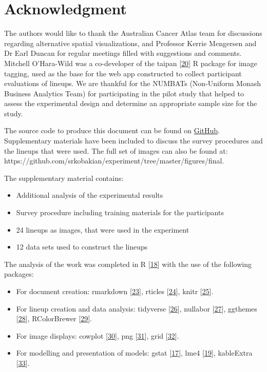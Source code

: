 \documentclass[conference,final,]{IEEEtran}
\providecommand{\tightlist}{%
  \setlength{\itemsep}{0pt}\setlength{\parskip}{0pt}}
\begin{document}
\hypertarget{acknowledgment}{%
\section{Acknowledgment}\label{acknowledgment}}

The authors would like to thank the Australian Cancer Atlas team for discussions regarding alternative spatial visualizations, and Professor Kerrie Mengersen and Dr Earl Duncan for regular meetings filled with suggestions and comments. Mitchell O'Hara-Wild was a co-developer of the taipan {[}\protect\hyperlink{ref-taipan}{20}{]} R package for image tagging, used as the base for the web app constructed to collect participant evaluations of lineups. We are thankful for the NUMBATs (Non-Uniform Monash Business Analytics Team) for participating in the pilot study that helped to assess the experimental design and determine an appropriate sample size for the study.

The source code to produce this document can be found on \href{https://github.com/srkobakian/experiment/tree/master/paper}{GitHub}.
Supplementary materials have been included to discuss the survey procedures and the lineups that were used.
The full set of images can also be found at: https://github.com/srkobakian/experiment/tree/master/figures/final.

The supplementary material contains:

\begin{itemize}
\tightlist
\item
  Additional analysis of the experimental results
\item
  Survey procedure including training materials for the participants
\item
  24 lineups as images, that were used in the experiment
\item
  12 data sets used to construct the lineups
\end{itemize}

The analysis of the work was completed in R {[}\protect\hyperlink{ref-RCore}{18}{]} with the use of the following packages:

\begin{itemize}
\tightlist
\item
  For document creation: rmarkdown {[}\protect\hyperlink{ref-rmarkdown}{23}{]}, rticles {[}\protect\hyperlink{ref-rticles}{24}{]}, knitr {[}\protect\hyperlink{ref-knitr}{25}{]}.
\item
  For lineup creation and data analysis: tidyverse {[}\protect\hyperlink{ref-tidyverse}{26}{]}, nullabor {[}\protect\hyperlink{ref-nullabor}{27}{]}, ggthemes {[}\protect\hyperlink{ref-ggthemes}{28}{]}, RColorBrewer {[}\protect\hyperlink{ref-RColorBrewer}{29}{]}.
\item
  For image displays: cowplot {[}\protect\hyperlink{ref-cowplot}{30}{]}, png {[}\protect\hyperlink{ref-png}{31}{]}, grid {[}\protect\hyperlink{ref-grid}{32}{]}.
\item
  For modelling and presentation of models: gstat {[}\protect\hyperlink{ref-gstat}{17}{]}, lme4 {[}\protect\hyperlink{ref-lme4}{19}{]}, kableExtra {[}\protect\hyperlink{ref-kableExtra}{33}{]}.
\end{itemize}
\end{document}
